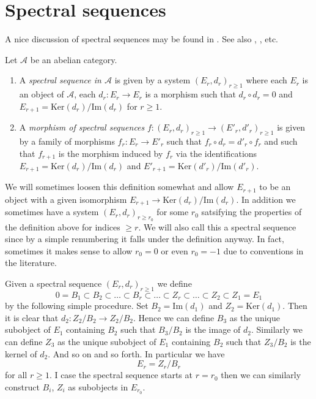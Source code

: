 \section{Spectral sequences}
\label{section-spectral-sequence}

\noindent
A nice discussion of spectral sequences may be found in
\cite{Eisenbud}. See also \cite{McCleary}, \cite{Lang}, etc.

\begin{definition}
\label{definition-spectral-sequence}
Let $\mathcal{A}$ be an abelian category.
\begin{enumerate}
\item A {\it spectral sequence in $\mathcal{A}$} is given by a
system $(E_r, d_r)_{r \geq 1}$ where each $E_r$ is an object
of $\mathcal{A}$, each $d_r : E_r \to E_r$ is a morphism such
that $d_r \circ d_r = 0$ and $E_{r + 1} = \text{Ker}(d_r)/\text{Im}(d_r)$
for $r \geq 1$.
\item A {\it morphism of spectral sequences}
$f : (E_r, d_r)_{r \geq 1} \to (E'_r, d'_r)_{r \geq 1}$ is
given by a family of morphisms $f_r : E_r \to E'_r$ such that
$f_r \circ d_r = d'_r \circ f_r$ and such that $f_{r + 1}$
is the morphism induced by $f_r$ via the identifications
$E_{r + 1} = \text{Ker}(d_r)/\text{Im}(d_r)$
and
$E'_{r + 1} = \text{Ker}(d'_r)/\text{Im}(d'_r)$.
\end{enumerate}
\end{definition}

\noindent
We will sometimes loosen this definition somewhat and allow $E_{r + 1}$
to be an object with a given isomorphism
$E_{r + 1} \to \text{Ker}(d_r)/\text{Im}(d_r)$.
In addition we sometimes have a system $(E_r, d_r)_{r \geq r_0}$
for some $r_0$ satsifying the properties of the definition above
for indices $\geq r$. We will also call this a spectral sequence since by
a simple renumbering it falls under the definition anyway.
In fact, sometimes it makes sense to allow $r_0 = 0$ or even $r_0 = -1$
due to conventions in the literature.

\medskip\noindent
Given a spectral sequence $(E_r, d_r)_{r \geq 1}$ we define
$$
0 = B_1 \subset B_2 \subset \ldots \subset B_r \subset \ldots
\subset Z_r \subset \ldots \subset Z_2 \subset Z_1 = E_1
$$
by the following simple procedure. Set $B_2 = \text{Im}(d_1)$
and $Z_2 = \text{Ker}(d_1)$. Then it is clear that
$d_2 : Z_2/B_2 \to Z_2/B_2$. Hence we can define $B_3$ as the unique
subobject of $E_1$ containing $B_2$ such that $B_3/B_2$ is the image
of $d_2$. Similarly we can define $Z_3$ as the unique subobject of
$E_1$ containing $B_2$ such that $Z_3/B_2$ is the kernel of $d_2$.
And so on and so forth. In particular we have
$$
E_r = Z_r/B_r
$$
for all $r \geq 1$. I case the spectral sequence starts at $r = r_0$
then we can similarly construct $B_i$, $Z_i$ as subobjects in $E_{r_0}$.

